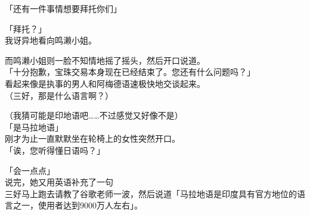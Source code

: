 「还有一件事情想要拜托你们」

「拜托？」\\

我讶异地看向鸣濑小姐。

而鸣濑小姐则一脸不知情地摇了摇头，然后开口说道。\\

「十分抱歉，宝珠交易本身现在已经结束了。您还有什么问题吗？」\\

看起来像是执事的男人和阿梅德语速极快地交谈起来。\\

（三好，那是什么语言啊？）

（我猜可能是印地语吧……不过感觉又好像不是）\\

「是马拉地语」\\

刚才为止一直默默坐在轮椅上的女性突然开口。\\

「诶，您听得懂日语吗？」

「会一点点」\\

说完，她又用英语补充了一句\\

三好马上跑去请教了谷歌老师一波，然后说道「马拉地语是印度具有官方地位的语言之一，使用者达到9000万人左右」。


